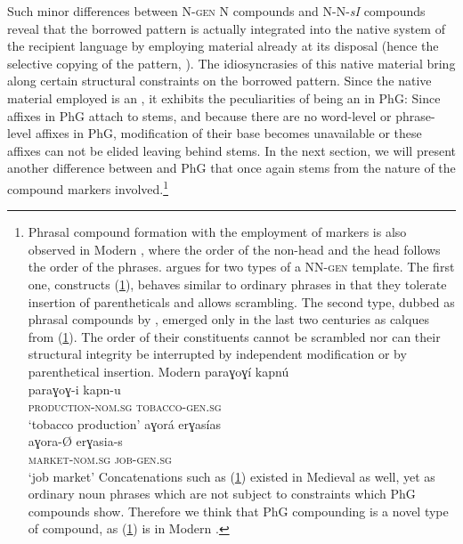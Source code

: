 \documentclass[output=paper]{LSP/langsci}
\begin{document}
Such minor differences between N-\textsc{gen} N compounds and N-N-\textit{sI} compounds reveal that the borrowed pattern is actually integrated into the native system of the recipient language by employing material already at its disposal (hence the selective copying of the pattern, \citealt{Johanson1992}). The idiosyncrasies of this native material bring along certain structural constraints on the borrowed pattern. Since the  native material employed is an , it exhibits the peculiarities of being an  in PhG: Since affixes in PhG attach to stems, and because there are no word-level or phrase-level affixes in PhG, modification of their base becomes unavailable or these affixes can not be elided leaving behind stems. In the next section, we will present another difference between  and PhG that once again stems from the nature of the compound markers involved.\footnote{Phrasal compound formation with the employment of  markers is also observed in Modern , where the order of the non-head and the head follows the order of the  phrases. \citet{Ralli2013moderngreek} argues for two types of a NN-\textsc{gen} template. The first one, constructs (\ref{ex:22ia}), behaves similar to ordinary phrases in that they tolerate insertion of parentheticals and allows scrambling. The second type, dubbed as phrasal compounds by \citet{Ralli2013moderngreek}, emerged only in the last two centuries as calques from  (\ref{ex:22ib}). The order of their constituents cannot be scrambled nor can their structural integrity be interrupted by independent modification or by parenthetical insertion.
\ea\label{ex:22i} Modern 
	\ea\label{ex:22ia}
		\glll 	paraɣoɣí kapnú\\
				paraɣoɣ-i kapn-u\\
				\textsc{production-nom.sg} \textsc{tobacco-gen.sg}\\
		\glt `tobacco production'
	\ex\label{ex:22ib}
		\glll aɣorá erɣasías\\
				aɣora-{\O} erɣasia-s\\
				\textsc{market-nom.sg} \textsc{job-gen.sg}\\
		\glt `job market'
	\z
\z
Concatenations such as (\ref{ex:22ia}) existed in Medieval  as well, yet as ordinary noun phrases which are not subject to constraints which PhG compounds show. Therefore we think that PhG compounding is a novel type of compound, as (\ref{ex:22ib}) is in Modern .
}
\end{document}
